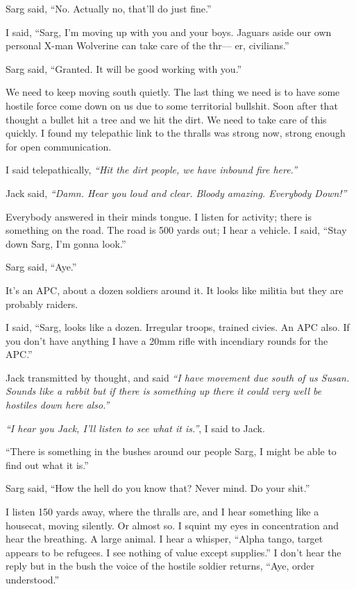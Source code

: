 Sarg said, ``No. Actually no, that'll do just fine.''

I said, ``Sarg, I'm moving up with you and your boys. Jaguars aside our own personal X-man Wolverine can take care of the thr--- er, civilians.''

Sarg said, ``Granted. It will be good working with you.''

We need to keep moving south quietly. The last thing we need is to have some hostile force come down on us due to some territorial bullshit. Soon after that thought a bullet hit a tree and we hit the dirt. We need to take care of this quickly. I found my telepathic link to the thralls was strong now, strong enough for open communication.

I said telepathically, \textit{``Hit the dirt people, we have inbound fire here.''}

Jack said, \textit{``Damn. Hear you loud and clear. Bloody amazing. Everybody Down!''}

Everybody answered in their minds tongue. I listen for activity; there is something on the road. The road is 500 yards out; I hear a vehicle. I said, ``Stay down Sarg, I'm gonna look.''

Sarg said, ``Aye.''

It's an APC, about a dozen soldiers around it. It looks like militia but they are probably raiders.

I said, ``Sarg, looks like a dozen. Irregular troops, trained civies. An APC also. If you don't have anything I have a 20mm rifle with incendiary rounds for the APC.''

Jack transmitted by thought, and said \textit{``I have movement due south of us Susan. Sounds like a rabbit but if there is something up there it could very well be hostiles down here also.''}

\textit{``I hear you Jack, I'll listen to see what it is.''}, I said to Jack.

``There is something in the bushes around our people Sarg, I might be able to find out what it is.''

Sarg said, ``How the hell do you know that? Never mind. Do your shit.''

I listen 150 yards away, where the thralls are, and I hear something like a housecat, moving silently. Or almost so. I squint my eyes in concentration and hear the breathing. A large animal. I hear a whisper, ``Alpha tango, target appears to be refugees. I see nothing of value except supplies.'' I don't hear the reply but in the bush the voice of the hostile soldier returns, ``Aye, order understood.''

